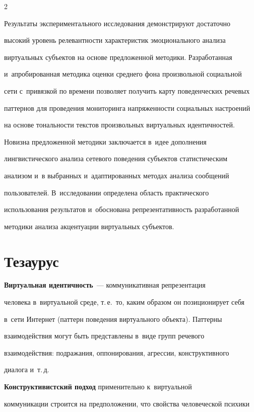 \begin{multicols}{2}
  

  Результаты экспериментального исследования демонстрируют достаточно 

высокий уровень релевантности характеристик эмоционального анализа 

виртуальных субъектов на основе предложенной методики. Разработанная 

и~апробированная методика оценки среднего фона произвольной социальной 

сети с~привязкой по времени позволяет получить карту поведенческих речевых 

паттернов для проведения мониторинга напряженности социальных настроений 

на основе тональности текстов произвольных виртуальных идентичностей.

  

  Новизна предложенной методики заключается в~идее дополнения 

лингвистического анализа сетевого поведения субъектов статистическим 

анализом и~в выбранных и~адаптированных методах анализа сообщений 

пользователей. В~исследовании определена область практического 

использования результатов и~обоснована репрезентативность разработанной 

методики анализа акцентуации виртуальных субъектов.

  

\section{Тезаурус}



  \textbf{Виртуальная идентичность}~--- коммуникативная репрезентация 

человека в~виртуальной среде, т.\,е.\ то, каким образом он позиционирует себя 

в~сети Интернет (паттерн поведения виртуального объекта). Паттерны 

взаимодействия могут быть представлены в~виде групп речевого 

взаимодействия: подражания, оппонирования, агрессии, конструктивного 

диалога и~т.\,д.

  

  \textbf{Конструктивистский подход} применительно к~виртуальной 

коммуникации строится на предположении, что свойства человеческой психики 


\end{multicols}

